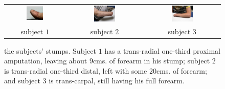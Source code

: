 \begin{figure}[!ht] \centering
  \begin{tabular}{ccc}
    \includegraphics[width=0.3\textwidth]{figs/stump_1} &
    \includegraphics[width=0.3\textwidth]{figs/stump_2} &
    \includegraphics[width=0.3\textwidth]{figs/stump_3} \\
    subject $1$ & subject $2$ & subject $3$ \\
  \end{tabular}
  \caption{the subjects' stumps. Subject $1$ has a trans-radial
    one-third proximal amputation, leaving about $9$cms. of forearm in his
    stump; subject $2$ is trans-radial one-third distal, left with some
    $20$cms. of forearm; and subject $3$ is trans-carpal, still having his
    full forearm.}
  \label{fig:stumps}
\end{figure}

